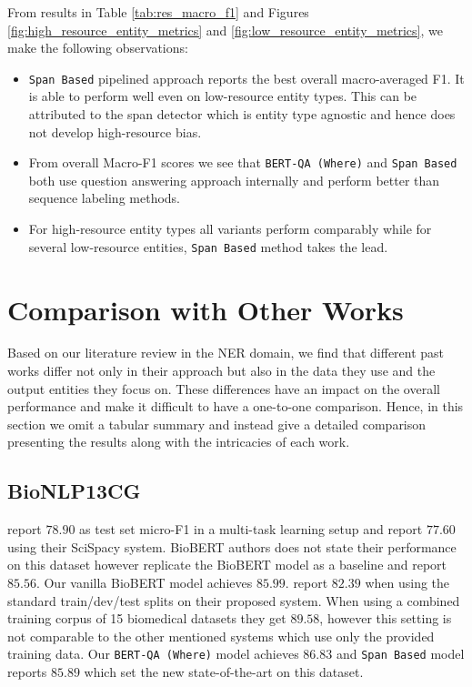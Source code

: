 From results in Table \ref{tab:res_macro_f1} and Figures \ref{fig:high_resource_entity_metrics} and \ref{fig:low_resource_entity_metrics}, we make the following observations:
\begin{itemize}
    \item \texttt{Span Based} pipelined approach reports the best overall macro-averaged F1. It is able to perform well even on low-resource entity types. This can be attributed to the span detector which is entity type agnostic and hence does not develop high-resource bias.
    
    \item From overall Macro-F1 scores we see that \texttt{BERT-QA (Where)} and \texttt{Span Based} both use question answering approach internally and perform better than sequence labeling methods. 
    
    \item For high-resource entity types all variants perform comparably while for several low-resource entities, \texttt{Span Based} method takes the lead.
\end{itemize}

\section{Comparison with Other Works}
\label{sec:sota_comparison}
Based on our literature review in the NER domain, we find that different past works differ not only in their approach but also in the data they use and the output entities they focus on. These differences have an impact on the overall performance and make it difficult to have a one-to-one comparison. Hence, in this section we omit a tabular summary and instead give a detailed comparison presenting the results along with the intricacies of each work. 

\subsection{BioNLP13CG}
\cite{crichton2017neural} report $78.90$ as test set micro-F1 in a multi-task learning setup and \cite{neumann2019scispacy} report $77.60$ using their SciSpacy system. BioBERT\cite{lee2020biobert} authors does not state their performance on this dataset however \cite{banerjee2019knowledge} replicate the BioBERT model as a baseline and report $85.56$. Our vanilla BioBERT model achieves $85.99$. \cite{banerjee2019knowledge} report $82.39$ when using the standard train/dev/test splits on their proposed system. When using a combined training corpus of 15 biomedical datasets they get $89.58$, however this setting is not comparable to the other mentioned systems which use only the provided training data. Our \texttt{BERT-QA (Where)} model achieves $86.83$ and \texttt{Span Based} model reports $85.89$ which set the new state-of-the-art on this dataset.

